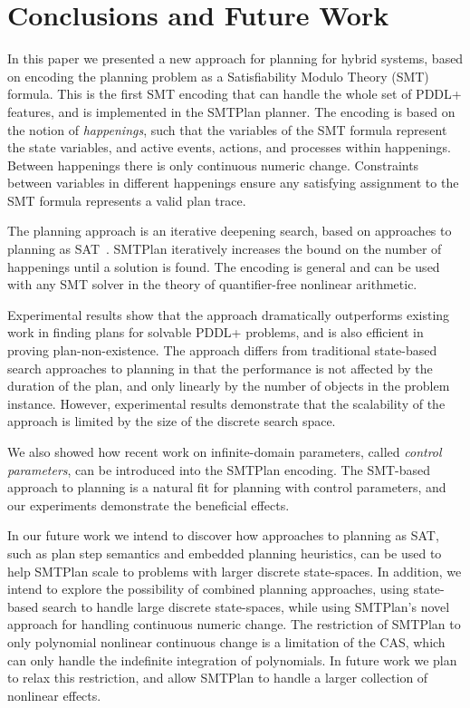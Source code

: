 \section{Conclusions and Future Work}\label{sec:conclusion}

In this paper we presented a new approach for planning for hybrid systems, based on encoding the planning problem as a Satisfiability Modulo Theory (SMT) formula. This is the first SMT encoding that can handle the whole set of PDDL+ features, and is implemented in the SMTPlan planner. The encoding is based on the notion of \textit{happenings}, such that the variables of the SMT formula represent the state variables, and active events, actions, and processes within happenings. Between happenings there is only continuous numeric change. Constraints between variables in different happenings ensure any satisfying assignment to the SMT formula represents a valid plan trace.

The planning approach is an iterative deepening search, based on approaches to planning as SAT~\cite{nab02,rin06}. SMTPlan iteratively increases the bound on the number of happenings until a solution is found.
The encoding is general and can be used with any SMT solver in the theory of quantifier-free nonlinear arithmetic.

Experimental results show that the approach dramatically outperforms existing work in finding plans for solvable PDDL+ problems, and is also efficient in proving plan-non-existence. The approach differs from traditional state-based search approaches to planning in that the performance is not affected by the duration of the plan, and only linearly by the number of objects in the problem instance. However, experimental results demonstrate that the scalability of the approach is limited by the size of the discrete search space.

We also showed how recent work on infinite-domain parameters, called \textit{control parameters}, can be introduced into the SMTPlan encoding. The SMT-based approach to planning is a natural fit for planning with control parameters, and our experiments demonstrate the beneficial effects.

In our future work we intend to discover how approaches to planning as SAT, such as plan step semantics and embedded planning heuristics, can be used to help SMTPlan scale to problems with larger discrete state-spaces. In addition, we intend to explore the possibility of combined planning approaches, using state-based search to handle large discrete state-spaces, while using SMTPlan's novel approach for handling continuous numeric change. The restriction of SMTPlan to only polynomial nonlinear continuous change is a limitation of the CAS, which can only handle the indefinite integration of polynomials. In future work we plan to relax this restriction, and allow SMTPlan to handle a larger collection of nonlinear effects.
